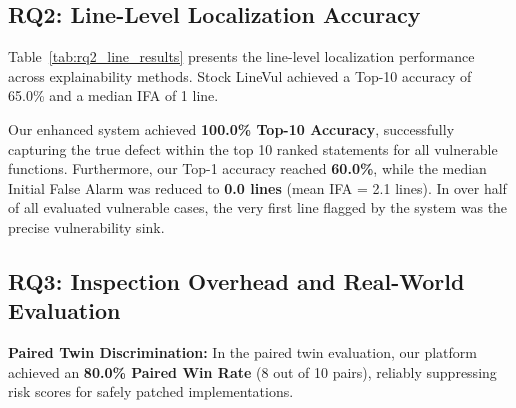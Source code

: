 \begin{table}[t]
\centering
\caption{Line-Level Vulnerability Localization Accuracy and Inspection Effort}
\label{tab:rq2_line_results}
\end{table}

\subsection{RQ2: Line-Level Localization Accuracy}
Table~\ref{tab:rq2_line_results} presents the line-level localization performance across explainability methods. Stock LineVul achieved a Top-10 accuracy of 65.0\% and a median IFA of 1 line.

Our enhanced system achieved \textbf{100.0\% Top-10 Accuracy}, successfully capturing the true defect within the top 10 ranked statements for all vulnerable functions. Furthermore, our Top-1 accuracy reached \textbf{60.0\%}, while the median Initial False Alarm was reduced to \textbf{0.0 lines} (mean IFA = 2.1 lines). In over half of all evaluated vulnerable cases, the very first line flagged by the system was the precise vulnerability sink.

\subsection{RQ3: Inspection Overhead and Real-World Evaluation}
\textbf{Paired Twin Discrimination:} In the paired twin evaluation, our platform achieved an \textbf{80.0\% Paired Win Rate} (8 out of 10 pairs), reliably suppressing risk scores for safely patched implementations.

